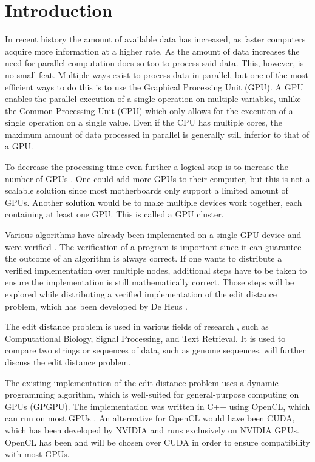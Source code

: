 \section{Introduction}
In recent history the amount of available data has increased, as faster computers acquire more information at a higher rate.
As the amount of data increases the need for parallel computation does so too to process said data.
This, however, is no small feat.
Multiple ways exist to process data in parallel, but one of the most efficient ways to do this is to use the Graphical Processing Unit (GPU).
A GPU enables the parallel execution of a single operation on multiple variables, unlike the Common Processing Unit (CPU) which only allows for the execution of a single operation on a single value.
Even if the CPU has multiple cores, the maximum amount of data processed in parallel is generally still inferior to that of a GPU.

To decrease the processing time even further a logical step is to increase the number of GPUs \cite{Cluster}.
One could add more GPUs to their computer, but this is not a scalable solution since most motherboards only support a limited amount of GPUs.
Another solution would be to make multiple devices work together, each containing at least one GPU.
This is called a GPU cluster.

Various algorithms have already been implemented on a single GPU device and were verified \cite{Heus}.
The verification of a program is important since it can guarantee the outcome of an algorithm is always correct.
If one wants to distribute a verified implementation over multiple nodes, additional steps have to be taken to ensure the implementation is still mathematically correct.
Those steps will be explored while distributing a verified implementation of the edit distance problem, which has been developed by De Heus \cite{Heus}.

The edit distance problem is used in various fields of research \cite{Navarro:2001:GTA:375360.375365}, such as Computational Biology, Signal Processing, and Text Retrieval.
It is used to compare two strings or sequences of data, such as genome sequences.
 will further discuss the edit distance problem.

The existing implementation of the edit distance problem uses a dynamic programming algorithm, which is well-suited for general-purpose computing on GPUs (GPGPU).
The implementation was written in C++ using OpenCL, which can run on most GPUs \cite{Kronos:conformant}.
An alternative for OpenCL would have been CUDA, which has been developed by NVIDIA and runs exclusively on NVIDIA GPUs.
OpenCL has been and will be chosen over CUDA in order to ensure compatibility with most GPUs.

